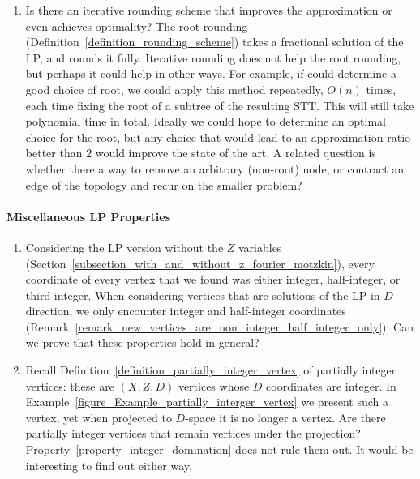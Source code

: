 \begin{enumerate}
    \item Is there an iterative rounding scheme that improves the approximation or even achieves optimality? The root rounding (Definition~\ref{definition_rounding_scheme}) takes a fractional solution of the LP, and rounds it fully. Iterative rounding does not help the root rounding, but perhaps it could help in other ways. For example, if could determine a good choice of root, we could apply this method repeatedly, $O(n)$ times, each time fixing the root of a subtree of the resulting STT. This will still take polynomial time in total. Ideally we could hope to determine an optimal choice for the root, but any choice that would lead to an approximation ratio better than $2$ would improve the state of the art.
    A related question is whether there a way to remove an arbitrary (non-root) node, or contract an edge of the topology and recur on the smaller problem?
    
\end{enumerate}

 \paragraph{Miscellaneous LP Properties}
\begin{enumerate}
    \item Considering the LP version without the $Z$ variables (Section~\ref{subsection_with_and_without_z_fourier_motzkin}), every coordinate of every vertex that we found was either integer, half-integer, or third-integer. When considering vertices that are solutions of the LP in $D$-direction, we only encounter integer and half-integer coordinates (Remark~\ref{remark_new_vertices_are_non_integer_half_integer_only}). Can we prove that these properties hold in general?

    \item Recall Definition~\ref{definition_partially_integer_vertex} of partially integer vertices: these are $(X,Z,D)$ vertices whose $D$ coordinates are integer. In Example~\ref{figure_Example_partially_interger_vertex} we present such a vertex, yet when projected to $D$-space it is no longer a vertex. Are there partially integer vertices that remain vertices under the projection? Property~\ref{property_integer_domination} does not rule them out. It would be interesting to find out either way.

\end{enumerate}

